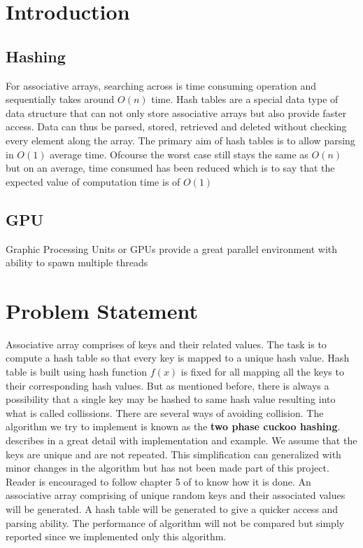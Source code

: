 \documentclass[a4paper,12pt]{report}
\begin{document}

\section{Introduction}
\subsection{Hashing}
For associative arrays, searching across is time consuming operation and sequentially takes around $O(n)$ time. 
Hash tables are a special data type of data structure that can not only store associative arrays but also 
provide faster access. Data can thus be parsed, stored, retrieved and deleted without checking every element 
along the array. The primary aim of hash tables is to allow parsing in $O(1)$ average time. Ofcourse the worst
 case still stays the same as $O(n)$ but on an average, time consumed has been reduced which is to say that the
 expected value of computation time is of $O(1)$
\subsection{GPU} Graphic Processing Units or GPUs provide a great parallel environment with ability to spawn 
multiple threads
\section{Problem Statement}
Associative array comprises of keys and their related values. The task is to compute a hash table so that every
 key is mapped to a unique hash value. Hash table is built using hash function $f(x)$ is fixed for all mapping all 
the keys to their corresponding hash values. But as mentioned before, there is always a possibility that a single key 
may be hashed to same hash value resulting into what is called collissions. There are several ways of avoiding collision. 
The algorithm we try to implement is known as the \textbf{two phase cuckoo hashing}. \cite{1} describes in a great 
detail with implementation and example. We assume that the keys are unique and are not repeated. This simplification 
can generalized with minor changes in the algorithm but has not been made part of this project. Reader is encouraged
 to follow chapter 5 of \cite{1} to know how it is done. An associative array comprising of unique random keys and 
their associated values will be generated. A hash table will be generated to give a quicker access and parsing ability.
 The performance of algorithm will not be compared but simply reported since we implemented only this algorithm. 
\end{document}
